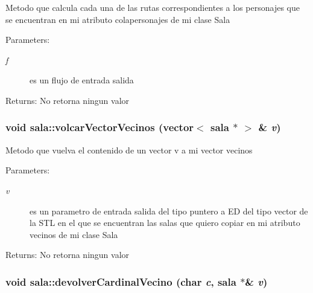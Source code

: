 Metodo que calcula cada una de las rutas correspondientes a los personajes que se encuentran en mi atributo colapersonajes de mi clase Sala \begin{Desc}
\item[Parameters:]
\begin{description}
\item[{\em f}]es un flujo de entrada salida \end{description}
\end{Desc}
\begin{Desc}
\item[Returns:]No retorna ningun valor \end{Desc}
\hypertarget{classsala_18ca39a6c0fea0cc2a0d155304b007fb}{
\subsubsection[volcarVectorVecinos]{\setlength{\rightskip}{0pt plus 5cm}void sala::volcarVectorVecinos (vector$<$ {\bf sala} $\ast$ $>$ \& {\em v})}}
\label{classsala_18ca39a6c0fea0cc2a0d155304b007fb}


Metodo que vuelva el contenido de un vector v a mi vector vecinos \begin{Desc}
\item[Parameters:]
\begin{description}
\item[{\em v}]es un parametro de entrada salida del tipo puntero a ED del tipo vector de la STL en el que se encuentran las salas que quiero copiar en mi atributo vecinos de mi clase Sala \end{description}
\end{Desc}
\begin{Desc}
\item[Returns:]No retorna ningun valor \end{Desc}
\hypertarget{classsala_c6ee6cab664ae4efa88eb4b7779b1498}{
\subsubsection[devolverCardinalVecino]{\setlength{\rightskip}{0pt plus 5cm}void sala::devolverCardinalVecino (char {\em c}, \/  {\bf sala} $\ast$\& {\em v})}}
\label{classsala_c6ee6cab664ae4efa88eb4b7779b1498}


